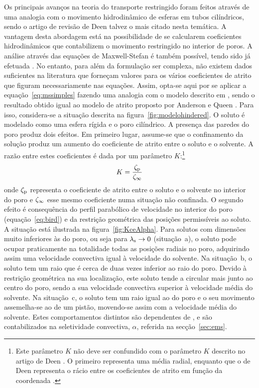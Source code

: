 Os principais avanços na teoria do transporte restringido foram feitos através de uma analogia com o movimento hidrodinâmico de esferas em tubos cilíndricos, sendo o artigo de revisão de Deen \cite{deen} talvez o mais citado nesta temática. A vantagem desta abordagem está na possibilidade de se calcularem coeficientes hidrodinâmicos que contabilizem o movimento restringido no interior de poros. A análise através das equações de Maxwell-Stefan é também possível, tendo sido já efetuada \cite{noordman}. No entanto, para além da formulação ser complexa, não existem dados suficientes na literatura que forneçam valores para os vários coeficientes de atrito que figuram necessariamente nas equações. 
Assim, opta-se aqui por se aplicar a equação~\ref{eq:mssimples} fazendo uma analogia com o modelo descrito em \cite{deen,anderson}, sendo o resultado obtido igual ao modelo de atrito proposto por Anderson e Queen \cite{anderson}. Para isso, considera-se a situação descrita na figura~\ref{fig:modelohindered}. O soluto é modelado como uma esfera rígida e o poro cilíndrico. A presença das paredes do poro produz dois efeitos. Em primeiro lugar, assume-se que o confinamento da solução produz um aumento do coeficiente de atrito entre o soluto e o solvente. A razão entre estes coeficientes é dada por um parâmetro $K$:\footnote{Este parâmetro $K$ não deve ser confundido com o parâmetro $K$ descrito no artigo de Deen \cite{deen}. O primeiro representa uma média radial, enquanto que o de Deen representa o rácio entre os coeficientes de atrito em função da coordenada \radialadimensional.}
\begin{equation}
 	\label{eq:K}
 	K=\frac{\zeta_{\mathrm{p}}}{\zeta_\infty}
 \end{equation} 
onde $\zeta_{\mathrm{p}}$ representa o coeficiente de atrito entre o soluto e o solvente no interior do poro e $\zeta_\infty$ esse mesmo coeficiente numa situação não confinada.
O segundo efeito é consequência do perfil parabólico de velocidade no interior do poro (equação~\ref{eq:bird}) e da restrição geométrica das posições permissíveis ao soluto. 
A situação está ilustrada na figura~\ref{fig:KceAlpha}. Para solutos com dimensões muito inferiores às do poro, ou seja para $\lambda_{\mathrm{s}}\rightarrow 0$ (situação~a), o soluto pode ocupar praticamente na totalidade todas as posições radiais no poro, adquirindo assim uma velocidade convectiva igual à velocidade do solvente. 
Na situação~b, o soluto tem um raio que é cerca de duas vezes inferior ao raio do poro. Devido à restrição geométrica na sua localização, este soluto tende a circular mais junto ao centro do poro, sendo a sua velocidade convectiva superior à velocidade média do solvente. Na situação~c, o soluto tem um raio igual ao do poro e o seu movimento assemelha-se ao de um pistão, movendo-se assim com a velocidade média do solvente. Estes comportamentos distintos são dependentes de \lambdas, e são contabilizados na seletividade convectiva, $\alpha$, referida na secção~\ref{sec:ems}. 
